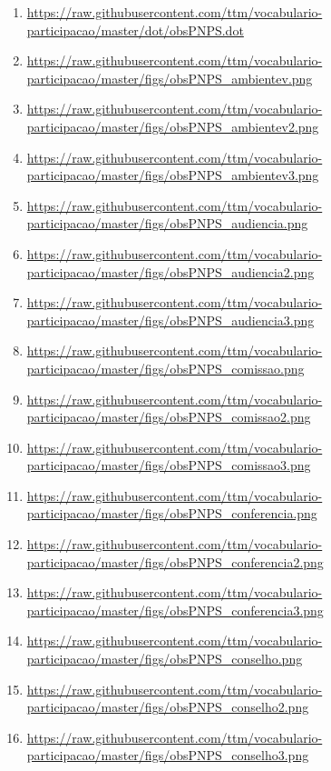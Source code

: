\documentclass[12pt]{article}
\begin{document}
{\begin{enumerate}
    \item  \url{https://raw.githubusercontent.com/ttm/vocabulario-participacao/master/dot/obsPNPS.dot}\label{i:76}
    \item  \url{https://raw.githubusercontent.com/ttm/vocabulario-participacao/master/figs/obsPNPS_ambientev.png}\label{i:76b}
    \item  \url{https://raw.githubusercontent.com/ttm/vocabulario-participacao/master/figs/obsPNPS_ambientev2.png}\label{i:76c}
    \item  \url{https://raw.githubusercontent.com/ttm/vocabulario-participacao/master/figs/obsPNPS_ambientev3.png}\label{i:76d}
    \item  \url{https://raw.githubusercontent.com/ttm/vocabulario-participacao/master/figs/obsPNPS_audiencia.png}\label{i:76e}
    \item  \url{https://raw.githubusercontent.com/ttm/vocabulario-participacao/master/figs/obsPNPS_audiencia2.png}\label{i:76f}
    \item  \url{https://raw.githubusercontent.com/ttm/vocabulario-participacao/master/figs/obsPNPS_audiencia3.png}\label{i:76g}
    \item  \url{https://raw.githubusercontent.com/ttm/vocabulario-participacao/master/figs/obsPNPS_comissao.png}\label{i:76h}
    \item  \url{https://raw.githubusercontent.com/ttm/vocabulario-participacao/master/figs/obsPNPS_comissao2.png}\label{i:76i}
    \item  \url{https://raw.githubusercontent.com/ttm/vocabulario-participacao/master/figs/obsPNPS_comissao3.png}\label{i:76j}
    \item  \url{https://raw.githubusercontent.com/ttm/vocabulario-participacao/master/figs/obsPNPS_conferencia.png}\label{i:76k}
    \item  \url{https://raw.githubusercontent.com/ttm/vocabulario-participacao/master/figs/obsPNPS_conferencia2.png}\label{i:76l}
    \item  \url{https://raw.githubusercontent.com/ttm/vocabulario-participacao/master/figs/obsPNPS_conferencia3.png}\label{i:76m}
    \item  \url{https://raw.githubusercontent.com/ttm/vocabulario-participacao/master/figs/obsPNPS_conselho.png}\label{i:76n}
    \item  \url{https://raw.githubusercontent.com/ttm/vocabulario-participacao/master/figs/obsPNPS_conselho2.png}\label{i:76o}
    \item  \url{https://raw.githubusercontent.com/ttm/vocabulario-participacao/master/figs/obsPNPS_conselho3.png}\label{i:76p}

\end{enumerate}}
\end{document}
